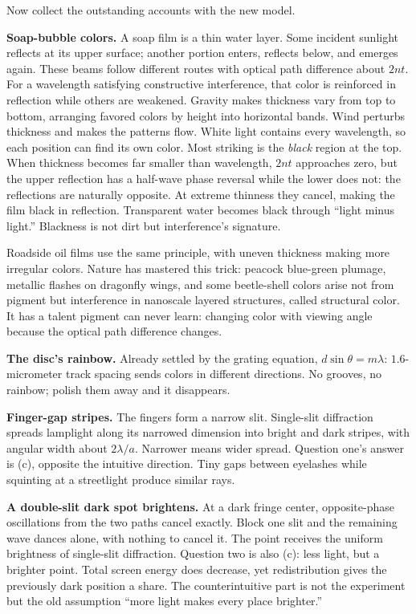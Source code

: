 
Now collect the outstanding accounts with the new model.

\textbf{Soap-bubble colors.} A soap film is a thin water layer. Some incident sunlight reflects at its upper surface; another portion enters, reflects below, and emerges again. These beams follow different routes with optical path difference about \(2nt\). For a wavelength satisfying constructive interference, that color is reinforced in reflection while others are weakened. Gravity makes thickness vary from top to bottom, arranging favored colors by height into horizontal bands. Wind perturbs thickness and makes the patterns flow. White light contains every wavelength, so each position can find its own color. Most striking is the \emph{black} region at the top. When thickness becomes far smaller than wavelength, \(2nt\) approaches zero, but the upper reflection has a half-wave phase reversal while the lower does not: the reflections are naturally opposite. At extreme thinness they cancel, making the film black in reflection. Transparent water becomes black through ``light minus light.'' Blackness is not dirt but interference's signature.

Roadside oil films use the same principle, with uneven thickness making more irregular colors. Nature has mastered this trick: peacock blue-green plumage, metallic flashes on dragonfly wings, and some beetle-shell colors arise not from pigment but interference in nanoscale layered structures, called structural color. It has a talent pigment can never learn: changing color with viewing angle because the optical path difference changes.

\textbf{The disc's rainbow.} Already settled by the grating equation, \(d\sin\theta=m\lambda\): \(1.6\)-micrometer track spacing sends colors in different directions. No grooves, no rainbow; polish them away and it disappears.

\textbf{Finger-gap stripes.} The fingers form a narrow slit. Single-slit diffraction spreads lamplight along its narrowed dimension into bright and dark stripes, with angular width about \(2\lambda/a\). Narrower means wider spread. Question one's answer is (c), opposite the intuitive direction. Tiny gaps between eyelashes while squinting at a streetlight produce similar rays.

\textbf{A double-slit dark spot brightens.} At a dark fringe center, opposite-phase oscillations from the two paths cancel exactly. Block one slit and the remaining wave dances alone, with nothing to cancel it. The point receives the uniform brightness of single-slit diffraction. Question two is also (c): less light, but a brighter point. Total screen energy does decrease, yet redistribution gives the previously dark position a share. The counterintuitive part is not the experiment but the old assumption ``more light makes every place brighter.''

